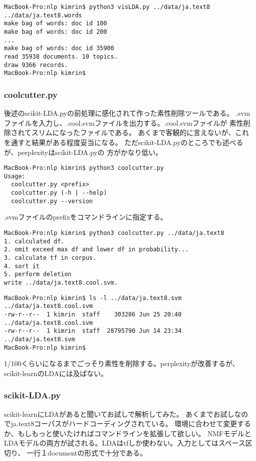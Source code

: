 \documentclass[uplatex]{jsarticle}
\begin{document}
\begin{lstlisting}
MacBook-Pro:nlp kimrin$ python3 visLDA.py ../data/ja.text8 ../data/ja.text8.words
make bag of words: doc id 100
make bag of words: doc id 200
...
make bag of words: doc id 35900
read 35938 documents. 10 topics.
draw 9366 records.
MacBook-Pro:nlp kimrin$
\end{lstlisting}

\subsubsection{coolcutter.py}
後述のscikit-LDA.pyの前処理に感化されて作った素性削除ツールである。
.svmファイルを入力し、.cool.svmファイルを出力する。.cool.svmファイルが
素性削除されてスリムになったファイルである。
あくまで客観的に言えないが、これを通すと結果がある程度妥当になる。
ただscikit-LDA.pyのところでも述べるが、perplexityはscikit-LDA.pyの
方がかなり低い。

\begin{lstlisting}
MacBook-Pro:nlp kimrin$ python3 coolcutter.py
Usage:
  coolcutter.py <prefix>
  coolcutter.py (-h | --help)
  coolcutter.py --version
\end{lstlisting}

.svmファイルのprefixをコマンドラインに指定する。
\begin{lstlisting}
MacBook-Pro:nlp kimrin$ python3 coolcutter.py ../data/ja.text8
1. calculated df.
2. omit exceed max df and lower df in probability...
3. calculate tf in corpus.
4. sort it
5. perform deletion
write ../data/ja.text8.cool.svm.
\end{lstlisting}


\begin{lstlisting}
MacBook-Pro:nlp kimrin$ ls -l ../data/ja.text8.svm ../data/ja.text8.cool.svm
-rw-r--r--  1 kimrin  staff    303286 Jun 25 20:40 ../data/ja.text8.cool.svm
-rw-r--r--  1 kimrin  staff  28795790 Jun 14 23:34 ../data/ja.text8.svm
MacBook-Pro:nlp kimrin$
\end{lstlisting}

1/100くらいになるまでごっそり素性を削除する。perplexityが改善するが、
scikit-learnのLDAには及ばない。

\subsubsection{scikit-LDA.py}
scikit-learnにLDAがあると聞いてお試しで解析してみた。
あくまでお試しなのでja.text8コーパスがハードコーディングされている。
環境に合わせて変更するか、もしもっと使いたければコマンドラインを拡張して欲しい。
NMFモデルとLDAモデルの両方が試される。LDAはtfしか使わない。入力としてはスペース区切り、
一行１documentの形式で十分である。
\end{document}
